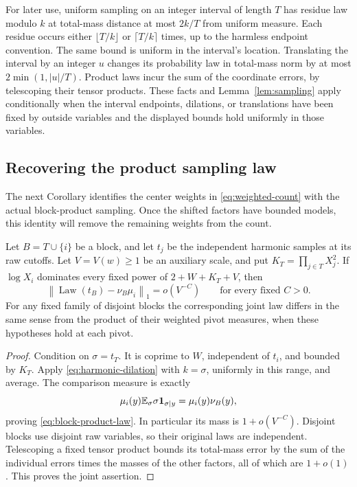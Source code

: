 For later use, uniform sampling on an integer interval of length
\(T\) has residue law modulo \(k\) at total-mass distance at most
\(2k/T\) from uniform measure.  Each residue occurs either
\(\lfloor T/k\rfloor\) or \(\lceil T/k\rceil\) times, up to
the harmless endpoint convention.  The same bound is uniform in
the interval's location.  Translating the interval by an integer
\(u\) changes its probability law in total-mass norm by at most
\(2\min(1,|u|/T)\).  Product laws incur the sum of the coordinate
errors, by telescoping their tensor products.  These facts and
Lemma~\ref{lem:sampling} apply conditionally when the interval
endpoints, dilations, or translations have been fixed by outside
variables and the displayed bounds hold uniformly in those variables.

\subsection{Recovering the product sampling law}

The next Corollary identifies the center weights in
\eqref{eq:weighted-count} with the actual block-product sampling.
Once the shifted factors have bounded models, this identity will remove
the remaining weights from the count.

\begin{corollary}\label{cor:product-law}
Let \(B=T\cup\{i\}\) be a block, and let \(t_j\) be the
independent harmonic samples at its raw cutoffs.  Let \(V=V(w)\ge1\)
be an auxiliary scale, and put
\(K_T=\prod_{j\in T}X_j^2\).  If \(\log X_i\) dominates
every fixed power of \(2+W+K_T+V\), then
\begin{equation}\label{eq:block-product-law}
 \left\|\operatorname{Law}(t_B)-
                  \nu_B\mu_i\right\|_1=o(V^{-C})
 \qquad\text{for every fixed }C>0.
\end{equation}
For any fixed family of disjoint blocks the corresponding joint
law differs in the same sense from the product of their weighted
pivot measures, when these hypotheses hold at each pivot.
\end{corollary}

\begin{proof}
Condition on \(\sigma=t_T\).  It is coprime to \(W\),
independent of \(t_i\), and bounded by \(K_T\).  Apply
\eqref{eq:harmonic-dilation} with \(k=\sigma\), uniformly in
this range, and average.  The comparison measure is exactly
\[
 \mu_i(y)\mathbb E_{\sigma}\sigma\mathbf 1_{\sigma\mid y}
     =\mu_i(y)\nu_B(y),
\]
proving \eqref{eq:block-product-law}.  In particular its mass is
\(1+o(V^{-C})\).  Disjoint blocks use disjoint raw variables, so
their original laws are independent.  Telescoping a fixed tensor
product bounds its total-mass error by the sum of the individual
errors times the masses of the other factors, all of which are
\(1+o(1)\).  This proves the joint assertion.
\end{proof}

